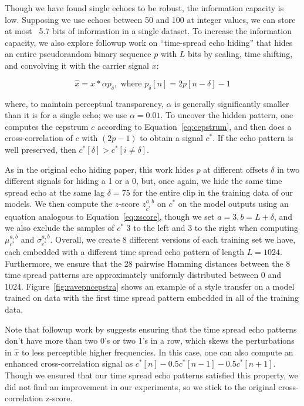 \documentclass[letterpaper]{article} %
\begin{document}
Though we have found single echoes to be robust, the information capacity is low.  Supposing we use echoes between 50 and 100 at integer values, we can store at most ~5.7 bits of information in a single dataset.  To increase the information capacity, we also explore followup work on ``time-spread echo hiding'' \cite{ko2005time} that hides an entire pseudorandom binary sequence $p$ with $L$ bits by scaling, time shifting, and convolving it with the carrier signal $x$:

\begin{equation}
\hat{x} = x * \alpha p_{\delta}, \text{ where } p_{\delta}[n] = 2 p[n - \delta] - 1
\end{equation}

where, to maintain perceptual transparency, $\alpha$ is generally significantly smaller than it is for a single echo; we use $\alpha = 0.01$.  To uncover the hidden pattern, one computes the cepstrum $c$ according to Equation~\ref{eq:cepstrum}, and then does a cross-correlation of $c$ with $(2p - 1)$ to obtain a signal $c^*$.  If the echo pattern is well preserved, then $c^*[\delta] > c^*[i \neq \delta]$.

As in the original echo hiding paper, this work hides $p$ at different offsets $\delta$ in two different signals for hiding a 1 or a 0, but, once again, we hide the same time spread echo at the same lag $\delta=75$ for the entire clip in the training data of our models.  We then compute the $z$-score $z_{c^*}^{a,b}$ on $c^*$ on the model outputs using an equation analogous to Equation~\ref{eq:zscore}, though we set $a = 3, b=L+\delta$, and we also exclude the samples of $c^*$ 3 to the left and 3 to the right when computing $\mu_{c^*}^{a,b}$ and $\sigma_{c^*}^{a,b}$.  Overall, we create 8 different versions of each training set we have, each embedded with a different time spread echo pattern of length $L=1024$.  Furthermore, we ensure that the 28 pairwise Hamming distances between the 8 time spread patterns are approximately uniformly distributed between 0 and 1024.  Figure~\ref{fig:ravepncepstra} shows an example of a style transfer on a model trained on data with the first time spread pattern embedded in all of the training data.


Note that followup work by \cite{xiang2010effective} suggests ensuring that the time spread echo patterns don't have more than two 0's or two 1's in a row, which skews the perturbations in $\hat{x}$ to less perceptible higher frequencies.  In this case, one can also compute an enhanced cross-correlation signal as $c^*[n] - 0.5c^*[n-1] - 0.5c^*[n+1]$.  Though we ensured that our time spread echo patterns satisfied this property, we did not find an improvement in our experiments, so we stick to the original cross-correlation z-score.
\end{document}

